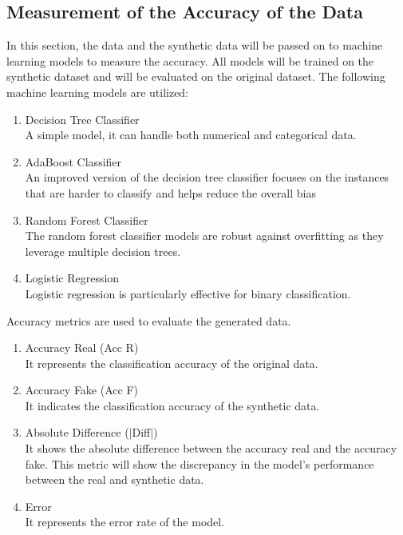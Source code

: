 \subsection{Measurement of the Accuracy of the Data}

In this section, the data and the synthetic data will be passed on to machine learning models to measure the accuracy. All models will be trained on the synthetic dataset and will be evaluated on the original dataset. The following machine learning models are utilized:

\begin{enumerate}
    \item Decision Tree Classifier \\
    A simple model, it can handle both numerical and categorical data.

    \item AdaBoost Classifier \\
    An improved version of the decision tree classifier focuses on the instances that are harder to classify and helps reduce the overall bias

    \item Random Forest Classifier \\
    The random forest classifier models are robust against overfitting as they leverage multiple decision trees.

    \item Logistic Regression \\
    Logistic regression is particularly effective for binary classification.
\end{enumerate}

\noindent Accuracy metrics are used to evaluate the generated data.

\begin{enumerate}
    \item Accuracy Real  (Acc R) \\
    It represents the classification accuracy of the original data. 

    \item Accuracy Fake (Acc F) \\
    It indicates the classification accuracy of the synthetic data.

    \item Absolute Difference ($|$Diff$|$) \\
    It shows the absolute difference between the accuracy real and the accuracy fake. This metric will show the discrepancy in the model's performance between the real and synthetic data.

    \item Error \\
    It represents the error rate of the model.
    
\end{enumerate}

